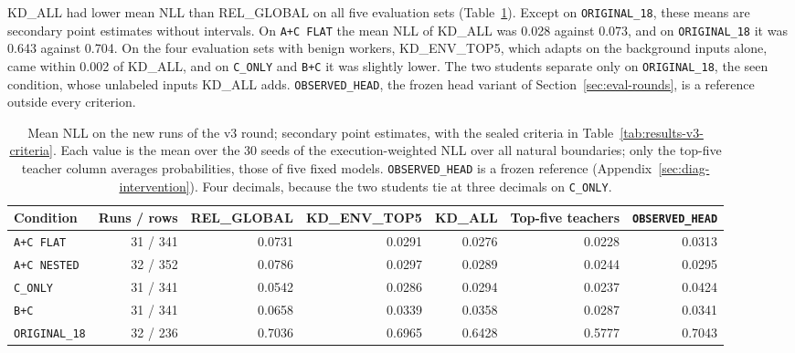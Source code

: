 KD\_ALL had lower mean NLL than REL\_GLOBAL on all five evaluation sets
(Table~\ref{tab:results-v3-nll}). Except on \texttt{ORIGINAL\_18}, these means are
secondary point estimates without intervals. On \texttt{A+C FLAT} the mean NLL of KD\_ALL was 0.028 against 0.073, and on
\texttt{ORIGINAL\_18} it was 0.643 against 0.704. On the four
evaluation sets with benign workers, KD\_ENV\_TOP5, which adapts on the background
inputs alone, came within 0.002 of KD\_ALL, and on \texttt{C\_ONLY} and
\texttt{B+C} it was slightly lower. The two students separate only on
\texttt{ORIGINAL\_18}, the seen condition, whose unlabeled inputs KD\_ALL adds.
\texttt{OBSERVED\_HEAD}, the frozen head variant of
Section~\ref{sec:eval-rounds}, is a reference outside every criterion.

\begin{table}[htbp]
\centering
\caption[Mean NLL on the new runs of the v3 round]{Mean NLL on the new runs of the v3 round; secondary point
estimates, with the sealed criteria in
Table~\ref{tab:results-v3-criteria}. Each value is the mean over the 30 seeds of the execution-weighted NLL
over all natural boundaries; only the top-five teacher column averages
probabilities, those of five fixed models. \texttt{OBSERVED\_HEAD} is a
frozen reference (Appendix~\ref{sec:diag-intervention}). Four decimals, because
the two students tie at three decimals on \texttt{C\_ONLY}.}
\label{tab:results-v3-nll}
\small
\setlength{\tabcolsep}{3.5pt}
\begin{tabular}{@{}lrrrrrr@{}}
\toprule
Condition & Runs / rows & REL\_GLOBAL & KD\_ENV\_TOP5 & KD\_ALL
  & Top-five teachers & \texttt{OBSERVED\_HEAD} \\
\midrule
\texttt{A+C FLAT}     & 31 / 341 & 0.0731 & 0.0291 & 0.0276 & 0.0228 & 0.0313 \\
\texttt{A+C NESTED}   & 32 / 352 & 0.0786 & 0.0297 & 0.0289 & 0.0244 & 0.0295 \\
\texttt{C\_ONLY}      & 31 / 341 & 0.0542 & 0.0286 & 0.0294 & 0.0237 & 0.0424 \\
\texttt{B+C}          & 31 / 341 & 0.0658 & 0.0339 & 0.0358 & 0.0287 & 0.0341 \\
\texttt{ORIGINAL\_18} & 32 / 236 & 0.7036 & 0.6965 & 0.6428 & 0.5777 & 0.7043 \\
\bottomrule
\end{tabular}
\end{table}


